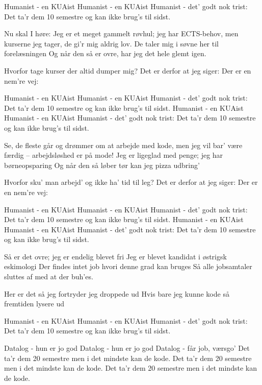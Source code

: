\documentclass[a4paper,11pt]{article}
\begin{document}
\begin{song}
 {
        Humanist - en KUAist
        Humanist - en KUAist
        Humanist - det’ godt nok trist:
        Det ta’r dem 10 semestre
        og kan ikke brug’s til sidst.
    }
%
     {
        Nu skal I høre:
        Jeg er et meget gammelt røvhul; jeg har ECTS-behov,
        men kurserne jeg tager, de gi’r mig aldrig lov.
        De taler mig i søvne her til forelæsningen
        Og når den så er ovre, har jeg det hele glemt igen.

        Hvorfor tage kurser der altid dumper mig?
        Det er derfor at jeg siger: Der er en nem're vej:
    }
     {
        Humanist - en KUAist
        Humanist - en KUAist
        Humanist - det’ godt nok trist:
        Det ta’r dem 10 semestre
        og kan ikke brug’s til sidst.
    }
     {
        Humanist - en KUAist
        Humanist - en KUAist
        Humanist - det’ godt nok trist:
        Det ta’r dem 10 semestre
        og kan ikke brug’s til sidst.
    }
%
     {
        Se, de fleste går og drømmer om at arbejde med kode,
        men jeg vil bar’ være færdig -- arbejdsløshed er på mode!
        Jeg er ligeglad med penge; jeg har børneopsparing
        Og når den så løber tør kan jeg pizza udbring’

        Hvorfor sku' man arbejd’ og ikke ha’ tid til leg?
        Det er derfor at jeg siger: Der er en nem're vej:
    }
     {
        Humanist - en KUAist
        Humanist - en KUAist
        Humanist - det’ godt nok trist:
        Det ta’r dem 10 semestre
        og kan ikke brug’s til sidst.
    }
     {
        Humanist - en KUAist
        Humanist - en KUAist
        Humanist - det’ godt nok trist:
        Det ta’r dem 10 semestre
        og kan ikke brug’s til sidst.
    }
%
     {
        Så er det ovre; jeg er endelig blevet fri
        Jeg er blevet kandidat i østrigsk eskimologi
        Der findes intet job hvori denne grad kan bruges
        Så alle jobsamtaler sluttes af med at der buh’es.

        Her er det så jeg fortryder jeg droppede ud
        Hvis bare jeg kunne kode så fremtiden lysere ud
    }
     {
        Humanist - en KUAist
        Humanist - en KUAist
        Humanist - det’ godt nok trist:
        Det ta’r dem 10 semestre
        og kan ikke brug’s til sidst.
    }

     {
        Datalog - hun er jo god
        Datalog - hun er jo god
        Datalog - får job, værsgo’
        Det ta’r dem 20 semestre
        men i det mindste kan de kode.
        Det ta’r dem 20 semestre
        men i det mindste kan de kode.
        Det ta’r dem 20 semestre
        men i det mindste kan de kode.
    }
  \end{song}
\end{document}
